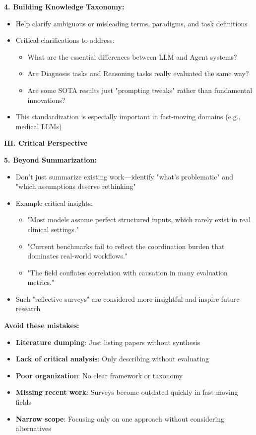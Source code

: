 \documentclass[11pt,a4paper]{article}
\begin{document}
\textbf{4. Building Knowledge Taxonomy:}
\begin{itemize}
    \item Help clarify ambiguous or misleading terms, paradigms, and task definitions
    \item Critical clarifications to address:
    \begin{itemize}
        \item What are the essential differences between LLM and Agent systems?
        \item Are Diagnosis tasks and Reasoning tasks really evaluated the same way?
        \item Are some SOTA results just "prompting tweaks" rather than fundamental innovations?
    \end{itemize}
    \item This standardization is especially important in fast-moving domains (e.g., medical LLMs)
\end{itemize}

\textbf{III. Critical Perspective}

\textbf{5. Beyond Summarization:}
\begin{itemize}
    \item Don't just summarize existing work—identify "what's problematic" and "which assumptions deserve rethinking"
    \item Example critical insights:
    \begin{itemize}
        \item "Most models assume perfect structured inputs, which rarely exist in real clinical settings."
        \item "Current benchmarks fail to reflect the coordination burden that dominates real-world workflows."
        \item "The field conflates correlation with causation in many evaluation metrics."
    \end{itemize}
    \item Such "reflective surveys" are considered more insightful and inspire future research
\end{itemize}

\begin{tcolorbox}[colback=yellow!10,colframe=red!50,title=Common Pitfalls in Survey Papers]
\textbf{Avoid these mistakes:}
\begin{itemize}
    \item \textbf{Literature dumping}: Just listing papers without synthesis
    \item \textbf{Lack of critical analysis}: Only describing without evaluating
    \item \textbf{Poor organization}: No clear framework or taxonomy
    \item \textbf{Missing recent work}: Surveys become outdated quickly in fast-moving fields
    \item \textbf{Narrow scope}: Focusing only on one approach without considering alternatives
\end{itemize}
\end{tcolorbox}
\end{document}
